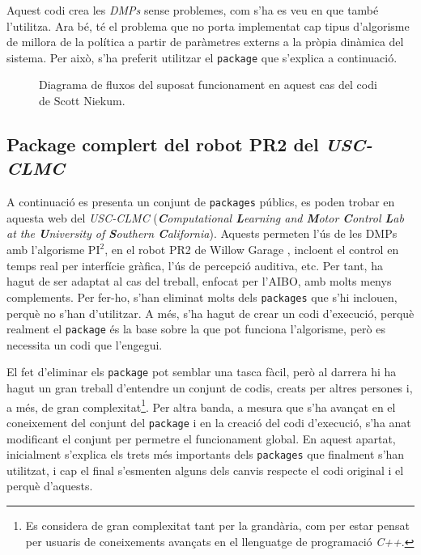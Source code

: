 \documentclass[12pt,a4paper,final,twoside]{report}
\begin{document}
Aquest codi crea les \textit{DMPs} sense problemes, com s'ha es veu en \cite{Pfeiffer2014} que també l'utilitza. Ara bé, té el problema que no porta implementat cap tipus d'algorisme de millora de la política a partir de paràmetres externs a la pròpia dinàmica del sistema. Per això, s'ha preferit utilitzar el \texttt{package} que s'explica a continuació.

\begin{figure}[bt]
\centering
\resizebox{\textwidth}{!}{}
\caption[Diagrama fluxos del codi de Scott Niekum]{Diagrama de fluxos del suposat funcionament en aquest cas del codi de Scott Niekum.}
\label{fig:diagrama-sniekum}
\end{figure}


\subsection{Package complert del robot PR2 del \textit{USC-CLMC}}
\label{Package-USC-CLMC}

A continuació es presenta un conjunt de  \texttt{packages} públics, es poden trobar en aquesta web \cite{USC-CLMC-package} del \textit{USC-CLMC} (\textit{\textbf{C}omputational \textbf{L}earning and \textbf{M}otor \textbf{C}ontrol \textbf{L}ab at the \textbf{U}niversity of \textbf{S}outhern \textbf{C}alifornia}). Aquests permeten l'ús de les DMPs amb l'algorisme $\mathrm{PI^2}$, en el robot PR2 de Willow Garage \cite{Bohren2011}, incloent el control en temps real per interfície gràfica, l'ús de percepció auditiva, etc. Per tant, ha hagut de ser adaptat al cas del treball, enfocat per l'AIBO, amb molts menys complements. Per fer-ho, s'han eliminat molts dels \texttt{packages} que s'hi inclouen, perquè no s'han d'utilitzar. A més, s'ha hagut de crear un codi d'execució, perquè realment el \texttt{package} és la base sobre la que pot funciona l'algorisme, però es necessita un codi que l'engegui. 

El fet d'eliminar els \texttt{package} pot semblar una tasca fàcil, però al darrera hi ha hagut un gran treball d'entendre un conjunt de codis, creats per altres persones i, a més, de gran complexitat\footnote{Es considera de gran complexitat tant per la grandària, com per estar pensat per usuaris de coneixements avançats en el llenguatge de programació \textit{C++}.}. Per altra banda, a mesura que s'ha avançat en el coneixement del conjunt del \texttt{package} i en la creació del codi d'execució, s'ha anat modificant el conjunt per permetre el funcionament global. En aquest apartat, inicialment s'explica els trets més importants dels \texttt{packages} que finalment s'han utilitzat, i cap el final s'esmenten alguns dels canvis respecte el codi original i el perquè d'aquests.
\end{document}
